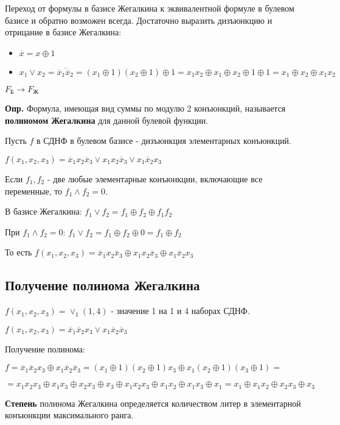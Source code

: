 \documentclass[10pt]{article}
\begin{document}
\par Переход от формулы в базисе Жегалкина к эквивалентной формуле в булевом базисе и обратно возможен всегда. Достаточно выразить дизъюнкцию и отрицание в базисе Жегалкина:
\begin{itemize}
    \item $\overline x = x \oplus 1$
    \item $x_1 \lor x_2 = \overline{\overline x_1 \overline x_2} = (x_1 \oplus 1)(x_2 \oplus 1) \oplus 1 = x_1 x_2 \oplus x_1 \oplus x_2 \oplus 1 \oplus 1 = x_1 \oplus x_2 \oplus x_1 x_2$
\end{itemize}

\par $F_\text{Б} \rightarrow F_\text{Ж}$

\par\textbf{Опр.} Формула, имеющая вид суммы по модулю 2 конъюнкций, называется \textbf{полиномом Жегалкина} для данной булевой функции.

\par Пусть $f$ в СДНФ в булевом базисе - дизъюнкция элементарных конъюнкций.
\par $f(x_1, x_2, x_3) = \overline x_1 x_2 \overline x_3 \lor x_1 x_2 \overline x_3 \lor x_1 \overline x_2 x_3$
\par Если $f_1, f_2$ - две любые элементарные конъюнкции, включающие все переменные, то $f_1 \land f_2 = 0$.
\par В базисе Жегалкина: $f_1 \lor f_2 = f_1 \oplus f_2 \oplus f_1 f_2$
\par При $f_1 \land f_2 = 0$: $f_1 \lor f_2 = f_1 \oplus f_2 \oplus 0 = f_1 \oplus f_2$
\par То есть $f(x_1, x_2, x_3) = \overline x_1 x_2 \overline x_3 \oplus x_1 x_2 \overline x_3 \oplus x_1 \overline x_2 x_3$
\subsection*{Получение полинома Жегалкина}
\par $f(x_1, x_2, x_3) = \lor_1(1, 4)$ - значение 1 на 1 и 4 наборах СДНФ.
\par $f(x_1, x_2, x_3) = \overline x_1 \overline x_2 x_3 \lor x_1 \overline x_2 \overline x_3$
\par Получение полинома:
\par $f = \overline x_1 \overline x_2 x_3 \oplus x_1 \overline x_2 \overline x_3 = (x_1 \oplus 1) (x_2 \oplus 1) x_3 \oplus x_1 (x_2 \oplus 1) (x_3 \oplus 1) =$
\par $=x_1 x_2 x_3 \oplus x_1 x_3 \oplus x_2 x_3 \oplus x_3 \oplus x_1 x_2 x_3 \oplus x_1 x_2 \oplus x_1 x_3 \oplus x_1 = x_1 \oplus x_1 x_2 \oplus x_2 x_3 \oplus x_3$
\par\textbf{Степень} полинома Жегалкина определяется количеством литер в элементарной конъюнкции максимального ранга.
\end{document}
